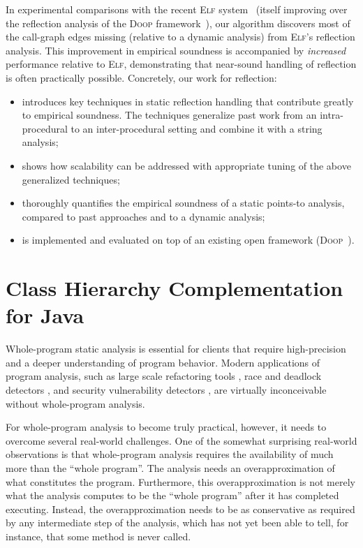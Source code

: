 \documentclass{llncs}
\begin{document}
In experimental comparisons with the recent \textsc{Elf}
system~\cite{ecoop/LiTSX14} (itself improving over the reflection
analysis of the \textsc{Doop} framework~\cite{oopsla/BravenboerS09}),
our algorithm discovers most of the call-graph edges missing (relative
to a dynamic analysis) from \textsc{Elf}'s reflection analysis.  This
improvement in empirical soundness is accompanied by \emph{increased}
performance relative to \textsc{Elf}, demonstrating that near-sound
handling of reflection is often practically possible. Concretely, our
work for reflection:
\begin{itemize}[\(\cdot\)]
\item introduces key techniques in static reflection handling that
  contribute greatly to empirical soundness. The techniques generalize
  past work from an intra-procedural to an inter-procedural setting
  and combine it with a string analysis;
\item shows how scalability can be addressed with appropriate tuning
  of the above generalized techniques;
\item thoroughly quantifies the empirical soundness of a static
  points-to analysis, compared to past approaches and to a dynamic
  analysis;
\item is implemented and evaluated on top of an existing open
  framework (\textsc{Doop}~\cite{oopsla/BravenboerS09}).
\end{itemize}

\section{Class Hierarchy Complementation for Java}

Whole-program static analysis is essential for clients that require
high-precision and a deeper understanding of program behavior. Modern
applications of program analysis, such as large scale refactoring
tools \cite{journals/software/Dig11}, race and deadlock detectors
\cite{pldi/NaikAW06}, and security vulnerability detectors
\cite{sigsoft/MadsenLF13,uss/GuarnieriL09}, are virtually
inconceivable without whole-program analysis.

For whole-program analysis to become truly practical, however, it
needs to overcome several real-world challenges. One of the somewhat
surprising real-world observations is that whole-program analysis
requires the availability of much more than the ``whole program''.
The analysis needs an overapproximation of what constitutes the
program. Furthermore, this overapproximation is not merely
what the analysis computes to be the ``whole program'' after it
has completed executing. Instead, the overapproximation needs to be
as conservative as required by any intermediate step of the analysis,
which has not yet been able to tell, for instance, that some method
is never called.
\end{document}
